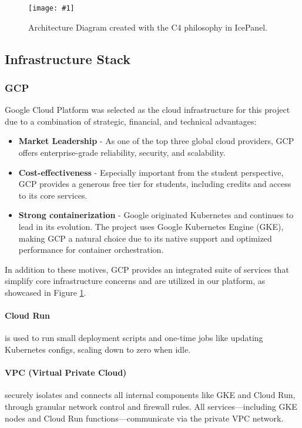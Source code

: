 \documentclass[11pt,a4paper]{article}
\newcommand{\fullpageimage}[1]{%
  \begin{adjustwidth*}{-0.1666\paperwidth}{-0.1666\paperwidth}
    \noindent\texttt{[image: \#1]}
  \end{adjustwidth*}
}
\begin{document}
\begin{figure}[H]

  \fullpageimage{Architecture_diagram.png}
  \caption[Architecture Diagram.]{Architecture Diagram created with
  the C4 philosophy in IcePanel.}
  \label{fig:architecture-diagram}
\end{figure}

\subsection{Infrastructure Stack}

\subsubsection{GCP}
Google Cloud Platform was selected as the cloud infrastructure for
this project due to a combination of strategic, financial, and
technical advantages:
\begin{itemize}
  \item \textbf{Market Leadership} - As one of the top three global
    cloud providers, GCP offers enterprise-grade reliability,
    security, and scalability.
  \item \textbf{Cost-effectiveness} - Especially important from the
    student perspective, GCP provides a generous free tier for
    students, including credits and access to its core services.
  \item \textbf{Strong containerization} -  Google originated
    Kubernetes and continues to lead in its evolution. The project
    uses Google Kubernetes Engine (GKE), making GCP a natural choice
    due to its native support and optimized performance for container
    orchestration.
\end{itemize}

In addition to these motives, GCP provides an integrated suite of
services that simplify core infrastructure concerns and are utilized
in our platform, as showcased in Figure \ref{fig:architecture-diagram}.

\paragraph{Cloud Run} is used to run small deployment scripts and
one-time jobs like updating Kubernetes configs, scaling down to zero when idle.

\paragraph{VPC (Virtual Private Cloud)} securely isolates and
connects all internal components like GKE and Cloud Run, through
granular network control and firewall rules. All services—including
GKE nodes and Cloud Run functions—communicate via the private VPC network.
\end{document}
